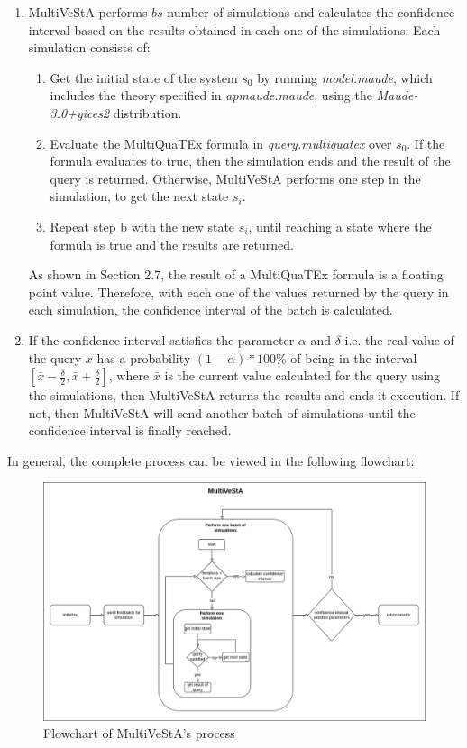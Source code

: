 \begin{enumerate}
    \item MultiVeStA performs $bs$ number of simulations and calculates the confidence interval based on the results obtained in each one of the simulations. Each simulation consists of:
        \begin{enumerate}
            \item Get the initial state of the system $s_0$ by running \textit{model.maude}, which includes the theory specified in \textit{apmaude.maude}, using the \textit{Maude-3.0+yices2} distribution.
            \item Evaluate the MultiQuaTEx formula in \textit{query.multiquatex} over $s_0$. If the formula evaluates to true, then the simulation ends and the result of the query is returned. Otherwise, MultiVeStA performs one step in the simulation, to get the next state $s_i$.
            \item Repeat step b with the new state $s_i$, until reaching a state where the formula is true and the results are returned. 
        \end{enumerate}
    As shown in Section 2.7, the result of a MultiQuaTEx formula is a floating point value. Therefore, with each one of the values returned by the query in each simulation, the confidence interval of the batch is calculated.
    
    \item If the confidence interval satisfies the parameter $\alpha$ and $\delta$ i.e. the real value of the query $x$ has a probability $(1-\alpha)*100\%$ of being in the interval $[\bar{x} - \frac{\delta}{2},\bar{x} + \frac{\delta}{2}]$, where $\bar{x}$ is the current value calculated for the query using the simulations, then MultiVeStA returns the results and ends it execution. If not, then MultiVeStA will send another batch of simulations until the confidence interval is finally reached.
\end{enumerate}
In general, the complete process can be viewed in the following flowchart:
\begin{figure}[H]
    \centering
    \includegraphics[scale = 0.4]{images/multi3.png}
    \caption{Flowchart of MultiVeStA's process}
    \label{fig:multi3}
\end{figure}

